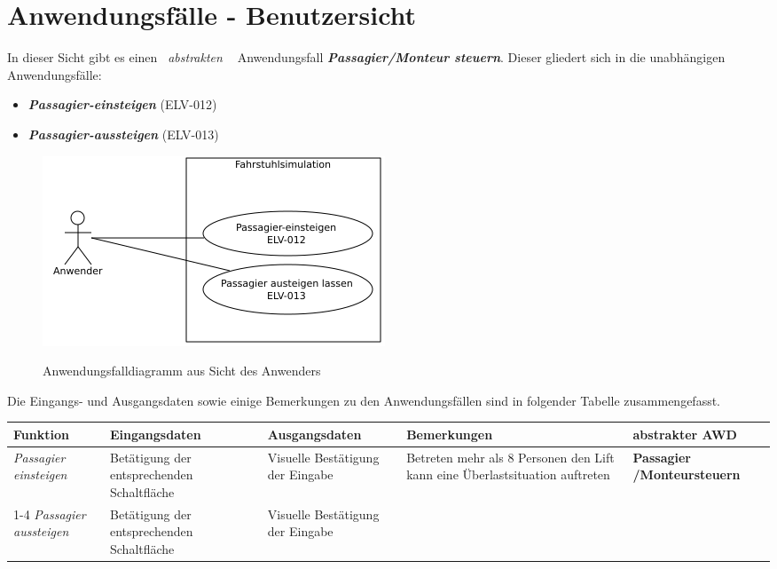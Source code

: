\newpage
\section{Anwendungsfälle - Benutzersicht}
In dieser Sicht gibt es einen \textit{\guillemotleft \ abstrakten \ \guillemotright} Anwendungsfall \textit{\textbf{\gls{Passagier}/\gls{Monteur} steuern}}. Dieser gliedert sich in die unabhängigen Anwendungsfälle:

\begin{itemize}
	\item \textit{\textbf{\gls{Passagier}-einsteigen}} (ELV-012)
	\item \textit{\textbf{\gls{Passagier}-aussteigen}} (ELV-013)
\end{itemize}

\begin{figure}[hbt]
	\includegraphics{images/anwenderAWF.png}
	\label{fig:anwenderAWF}
	\caption{Anwendungsfalldiagramm aus Sicht des Anwenders}
\end{figure}

Die Eingangs- und Ausgangsdaten sowie einige Bemerkungen zu den Anwendungsfällen sind in folgender Tabelle zusammengefasst.

 {
\vspace{1cm}
\hspace{-0,5cm}
\footnotesize
\begin{tabular}{|p{}|p{}|p{}|p{}|p{2cm}|}
	\hline
		\textbf{Funktion} &
		\textbf{Eingangsdaten} &
		\textbf{Ausgangsdaten} &
		\textbf{Bemerkungen} &
		\textbf{abstrakter AWD} \\
	\hline \hline
		\textit{Passagier \newline einsteigen} &
		Betätigung der entsprechenden Schaltfläche &
		Visuelle Bestätigung der Eingabe &
		Betreten mehr als 8 Personen den Lift kann eine Überlastsituation auftreten&
		\textbf{Passagier /\newline Monteur\newline steuern} \\
	\cline{1-4}
		\textit{Passagier \newline aussteigen} &
		Betätigung der entsprechenden Schaltfläche &
		Visuelle Bestätigung der Eingabe &
		&
		\\
	\hline
\end{tabular}
}

